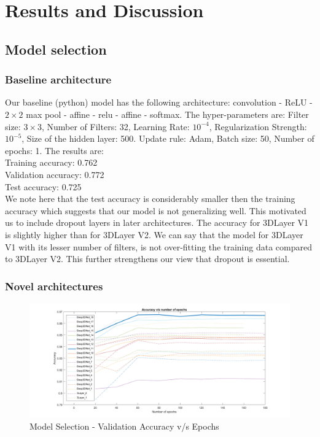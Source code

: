 \documentclass[10pt,twocolumn,letterpaper]{article}
\begin{document}
\section{Results and Discussion}
\subsection{Model selection}
\subsubsection{Baseline architecture}
Our baseline (python) model has the following architecture:
convolution - ReLU - $2 \times 2$ max pool - affine - relu - affine - softmax. The hyper-parameters are: Filter size: $3 \times 3$, Number of Filters: 32, Learning Rate: $10^{-4}$, Regularization Strength: $10^{-5}$, Size of the hidden layer: 500. Update rule: Adam, Batch size: 50, Number of epochs: 1. The results are:\\
Training accuracy: 0.762\\
Validation accuracy: 0.772\\
Test accuracy: 0.725\\    
We note here that the test accuracy is considerably smaller then the training accuracy which suggests that our model is not generalizing well. This motivated us to include dropout layers in later architectures. The accuracy for 3DLayer V1 is slightly higher than for 3DLayer V2. We can say that the model for 3DLayer V1 with its lesser number of filters, is not over-fitting the training data compared to 3DLayer V2. This further strengthens our view that dropout is essential. 
\subsubsection{Novel architectures}

\begin{figure}
\begin{center}
\includegraphics[width=\linewidth]{Model_Selection_Accuracy.png}
\end{center}
   \caption{Model Selection - Validation Accuracy v/s Epochs}
\label{model_accuracy}
\end{figure}
\end{document}
